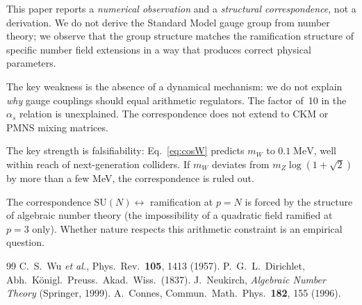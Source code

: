 \documentclass[aps,prl,twocolumn,superscriptaddress,nofootinbib]{revtex4-2}
\newcommand{\SU}{\mathrm{SU}}
\begin{document}
This paper reports a \emph{numerical observation} and a
\emph{structural correspondence}, not a derivation.  We do not
derive the Standard Model gauge group from number theory; we
observe that the group structure matches the ramification structure
of specific number field extensions in a way that produces correct
physical parameters.

The key weakness is the absence of a dynamical mechanism: we do not
explain \emph{why} gauge couplings should equal arithmetic
regulators.  The factor of~10 in the $\alpha_s$ relation is
unexplained.  The correspondence does not extend to CKM or PMNS
mixing matrices.

The key strength is falsifiability:
Eq.~\eqref{eq:cosW} predicts $m_W$ to $0.1\;\mathrm{MeV}$, well
within reach of next-generation colliders.  If $m_W$ deviates from
$m_Z\log(1{+}\sqrt{2})$ by more than a few MeV, the correspondence
is ruled out.

The correspondence $\SU(N)\leftrightarrow$ ramification at $p=N$
is forced by the structure of algebraic number theory (the
impossibility of a quadratic field ramified at $p=3$ only).
Whether nature respects this arithmetic constraint is an empirical
question.

\begin{thebibliography}{99}
 C.~S.~Wu \textit{et al.}, Phys.\ Rev.\ \textbf{105}, 1413 (1957).
 P.~G.~L.~Dirichlet, Abh.\ K\"onigl.\ Preuss.\ Akad.\ Wiss.\ (1837).
 J.~Neukirch, \textit{Algebraic Number Theory} (Springer, 1999).
 A.~Connes, Commun.\ Math.\ Phys.\ \textbf{182}, 155 (1996).
\end{thebibliography}
\end{document}

